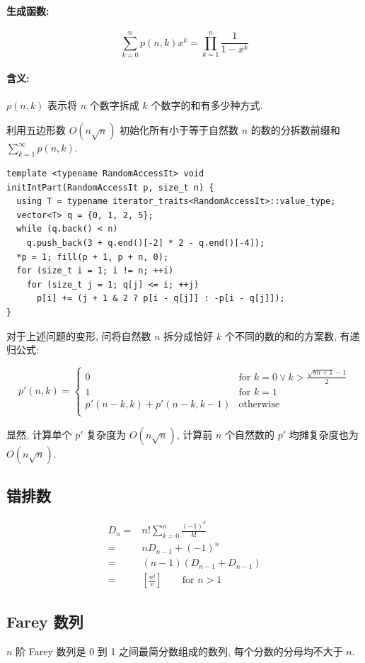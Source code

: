 \paragraph{生成函数:}
\[\sum_{k=0}^np(n,k)x^k=\prod_{k=1}^n\frac1{1-x^k}\]

\paragraph{含义:} $p(n,k)$ 表示将 $n$ 个数字拆成 $k$ 个数字的和有多少种方式.

利用五边形数 $O(n\sqrt n)$ 初始化所有小于等于自然数 $n$ 的数的分拆数前缀和 $\displaystyle\sum_{k=1}^\infty p(n,k)$.

\begin{lstlisting}
template <typename RandomAccessIt> void
initIntPart(RandomAccessIt p, size_t n) {
  using T = typename iterator_traits<RandomAccessIt>::value_type;
  vector<T> q = {0, 1, 2, 5};
  while (q.back() < n)
    q.push_back(3 + q.end()[-2] * 2 - q.end()[-4]);
  *p = 1; fill(p + 1, p + n, 0);
  for (size_t i = 1; i != n; ++i)
    for (size_t j = 1; q[j] <= i; ++j)
      p[i] += (j + 1 & 2 ? p[i - q[j]] : -p[i - q[j]]);
}
\end{lstlisting}

对于上述问题的变形, 问将自然数 $n$ 拆分成恰好 $k$ 个不同的数的和的方案数, 有递归公式:

\[
p'(n,k)=\begin{cases}
  0&\displaystyle\text{for }k=0\lor k>\frac{\sqrt{8n+1}-1}2\\
  1&\text{for }k=1\\
  p'(n-k,k)+p'(n-k,k-1)&\text{otherwise}\\
\end{cases}
\]

显然, 计算单个 $p'$ 复杂度为 $O(n\sqrt n)$, 计算前 $n$ 个自然数的 $p'$ 均摊复杂度也为 $O(n\sqrt n)$.

\subsection{错排数}
\[
  \begin{aligned}
    D_n=&n!\sum_{k=0}^n\frac{(-1)^k}{k!}\\
    =&nD_{n-1}+(-1)^n\\
    =&(n-1)(D_{n-1}+D_{n-1})\\
    =&\left[\frac{n!}{\mathrm e}\right]\qquad\text{for }n>1
  \end{aligned}
\]

\subsection{Farey 数列}
$n$ 阶 Farey 数列是 0 到 1 之间最简分数组成的数列, 每个分数的分母均不大于 $n$.

